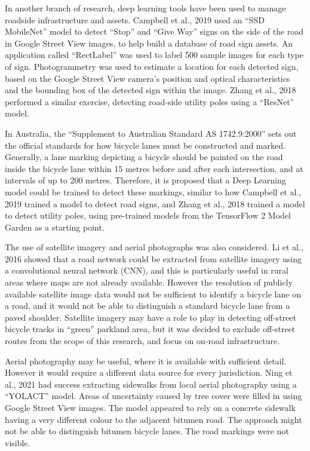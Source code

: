 \documentclass[11pt,twoside]{report}
\begin{document}
In another branch of research, deep learning tools have been used to manage roadside infrastructure and assets.  Campbell et al., 2019 \cite{CAMPBELL2019101350} used an ``SSD MobileNet'' model to detect ``Stop'' and ``Give Way'' signs on the side of the road in Google Street View images, to help build a database of road sign assets.  An application called ``RectLabel'' was used to label 500 sample images for each type of sign.  Photogrammetry was used to estimate a location for each detected sign, based on the Google Street View camera's position and optical characteristics and the bounding box of the detected sign within the image.  Zhang et al., 2018 \cite{s18082484} performed a similar exercise, detecting road-side utility poles using a ``ResNet'' model.

In Australia, the ``Supplement to Australian Standard AS 1742.9:2000'' sets out the official standards for how bicycle lanes must be constructed and marked.  Generally, a lane marking depicting a bicycle should be painted on the road inside the bicycle lane within 15 metres before and after each intersection, and at intervals of up to 200 metres\cite{standards}.  Therefore, it is proposed that a Deep Learning model could be trained to detect these markings, similar to how Campbell et al., 2019 \cite{CAMPBELL2019101350} trained a model to detect road signs, and Zhang et al., 2018 \cite{s18082484} trained a model to detect utility poles, using pre-trained models from the TensorFlow 2 Model Garden \cite{zoo} as a starting point.

The use of satellite imagery and aerial photographs was also considered.  Li et al., 2016 \cite{ROADNETWORK} showed that a road network could be extracted from satellite imagery using a convolutional neural network (CNN), and this is particularly useful in rural areas where maps are not already available.  However the resolution of publicly available satellite image data would not be sufficient to identify a bicycle lane on a road, and it would not be able to distinguish a standard bicycle lane from a paved shoulder.  Satellite imagery may have a role to play in detecting off-street bicycle tracks in ``green'' parkland area, but it was decided to exclude off-street routes from the scope of this research, and focus on on-road infrastructure.

Aerial photography may be useful, where it is available with sufficient detail.  However it would require a different data source for every jurisdiction.  Ning et al., 2021 \cite{NING2021} had success extracting sidewalks from local aerial photography using a ``YOLACT'' model.  Areas of uncertainty caused by tree cover were filled in using Google Street View images.  The model appeared to rely on a concrete sidewalk having a very different colour to the adjacent bitumen road.  The approach might not be able to distinguish bitumen bicycle lanes.  The road markings were not visible.
\end{document}
